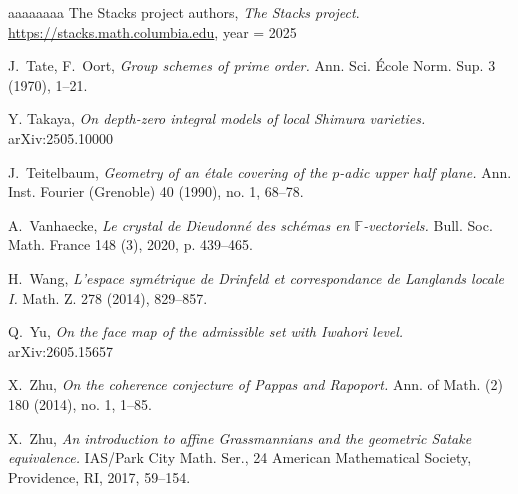 \documentclass[reqno, 10pt]{amsart}
\newcommand{\BF}{\ensuremath{\mathbb {F}}\xspace}
\theoremstyle{definition}
\numberwithin{equation}{subsection}
\numberwithin{subsubsection}{subsection}
\begin{document}
\begin{thebibliography}{aaaaaaaa}
 The Stacks project authors,
 \emph{The Stacks project}.
 {\url{https://stacks.math.columbia.edu}},
  year         = {2025}
  
  J.~Tate, F.~Oort, \emph{Group schemes of prime order.} Ann. Sci. \'Ecole Norm. Sup. 3 (1970), 1--21.
 
  Y. Takaya,  \emph{On depth-zero integral models of local Shimura varieties.} arXiv:2505.10000

 
  J.~Teitelbaum, \emph{Geometry of an \'etale covering of the  $p$-adic upper half plane.} Ann. Inst. Fourier (Grenoble) 40 (1990), no. 1, 68--78.
   
   A.~Vanhaecke, \emph{Le crystal de Dieudonn\'e des sch\'emas en $\BF$-vectoriels.} Bull. Soc. Math. France
148 (3), 2020, p. 439--465.

 H.~Wang, \emph{L'espace sym\'etrique de Drinfeld et correspondance de Langlands locale I.}
Math. Z. 278 (2014),  829--857.


    Q.~Yu, \emph{On the face map of the admissible set with Iwahori level.} arXiv:2605.15657
      
    X.~Zhu, \emph{On the coherence conjecture of Pappas and Rapoport.}
Ann. of Math. (2) 180 (2014), no. 1, 1--85.

    X.~Zhu, \emph{An introduction to affine Grassmannians and the geometric Satake equivalence.}
IAS/Park City Math. Ser., 24
American Mathematical Society, Providence, RI, 2017, 59–154.
   
   
   \end{thebibliography}
  
  
  
 
  
\end{document}
